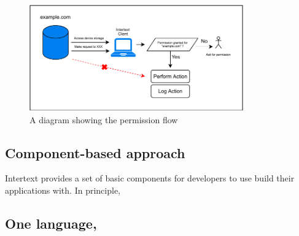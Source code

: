 \begin{figure}
  \centering
  \includegraphics[width=9.2cm]{thesis/paper/images/permission.pdf}
  \caption{A diagram showing the permission flow}%
  \label{fig:permission_flow}%
\end{figure}


\subsection{Component-based approach}

Intertext provides a set of basic components for developers to use build their applications with. In principle, 


\subsection{One language, }


  
